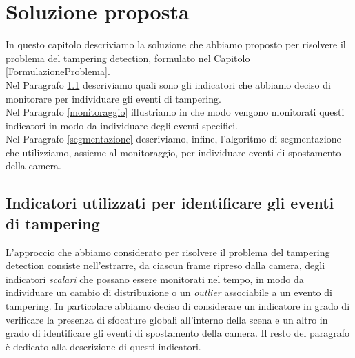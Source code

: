 \chapter{Soluzione proposta}
\label{SoluzioneProposta}
\thispagestyle{empty}

\vspace{0.5cm}

\noindent In questo capitolo descriviamo la soluzione che abbiamo proposto per risolvere il problema del tampering detection, formulato nel Capitolo \ref{FormulazioneProblema}.\\
Nel Paragrafo \ref{indicatori} descriviamo quali sono gli indicatori che abbiamo deciso di monitorare per individuare gli eventi di tampering.\\
Nel Paragrafo  \ref{monitoraggio} illustriamo in che modo vengono monitorati questi indicatori in modo da individuare degli eventi specifici.\\
Nel Paragrafo \ref{segmentazione} descriviamo, infine, l'algoritmo di segmentazione che utilizziamo, assieme al monitoraggio, per individuare eventi di spostamento della camera.
\section{Indicatori utilizzati per identificare gli eventi di tampering}
\label{indicatori}
L'approccio che abbiamo considerato per risolvere il problema del tampering detection consiste nell'estrarre, da ciascun frame ripreso dalla camera, degli indicatori \textit{scalari} che possano essere monitorati nel tempo, in modo da individuare un cambio di distribuzione o un \textit{outlier} associabile a un evento di tampering. 
In particolare abbiamo deciso di considerare un indicatore in grado di verificare la presenza di sfocature globali all'interno della scena e un altro in grado di identificare gli eventi di spostamento della camera.
Il resto del paragrafo \`e dedicato alla descrizione di questi indicatori.
